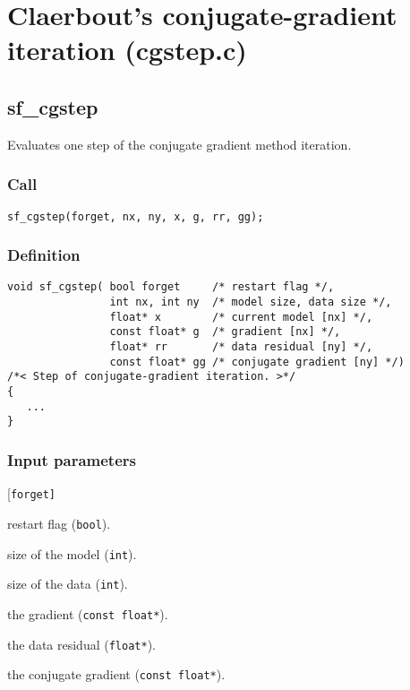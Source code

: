 \section{Claerbout's conjugate-gradient iteration (cgstep.c)}




\subsection{{sf\_cgstep}}
Evaluates one step of the conjugate gradient method iteration.

\subsubsection*{Call}
\begin{verbatim}sf_cgstep(forget, nx, ny, x, g, rr, gg);\end{verbatim}

\subsubsection*{Definition}
\begin{verbatim}
void sf_cgstep( bool forget     /* restart flag */, 
                int nx, int ny  /* model size, data size */, 
                float* x        /* current model [nx] */, 
                const float* g  /* gradient [nx] */, 
                float* rr       /* data residual [ny] */, 
                const float* gg /* conjugate gradient [ny] */) 
/*< Step of conjugate-gradient iteration. >*/
{
   ...
}
\end{verbatim}

\subsubsection*{Input parameters}
\begin{desclist}{\tt }{\quad}[\tt forget]
   \setlength\itemsep{0pt}
   \item[forget] restart flag (\texttt{bool}). 
   \item[nx]     size of the model (\texttt{int}). 
   \item[ny]     size of the data (\texttt{int}). 
   \item[g]      the gradient (\texttt{const float*}).  
   \item[rr]     the data residual (\texttt{float*}).  
   \item[gg]     the conjugate gradient (\texttt{const float*}).  
\end{desclist}

